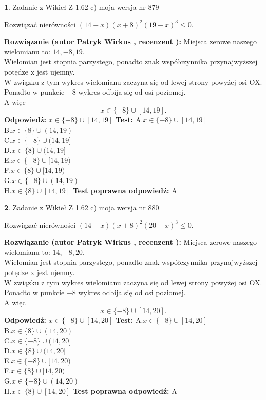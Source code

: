 \documentclass[12pt, a4paper]{article}
\theoremstyle{definition} %
\newtheorem{zad}{}
\newcommand{\zadStart}[1]{\begin{zad}#1\newline}
\newcommand{\zadStop}{\end{zad}}
\newcommand{\rozwStart}[2]{\noindent \textbf{Rozwiązanie (autor #1 , recenzent #2): }\newline}
\newcommand{\rozwStop}{\newline}
\newcommand{\odpStart}{\noindent \textbf{Odpowiedź:}\newline}
\newcommand{\odpStop}{\newline}
\newcommand{\testStart}{\noindent \textbf{Test:}\newline}
\newcommand{\testStop}{\newline}
\newcommand{\kluczStart}{\noindent \textbf{Test poprawna odpowiedź:}\newline}
\newcommand{\kluczStop}{\newline}
\begin{document}
\zadStart{Zadanie z Wikieł Z 1.62 c) moja wersja nr 879}

Rozwiązać nierówności $(14-x)(x+8)^{2}(19-x)^{3}\le0$.
\zadStop
\rozwStart{Patryk Wirkus}{}
Miejsca zerowe naszego wielomianu to: $14, -8, 19$.\\
Wielomian jest stopnia parzystego, ponadto znak współczynnika przy\linebreak najwyższej potędze x jest ujemny.\\ W związku z tym wykres wielomianu zaczyna się od lewej strony powyżej osi OX.\\
Ponadto w punkcie $-8$ wykres odbija się od osi poziomej.\\
A więc $$x \in \{-8\} \cup [14,19].$$
\rozwStop
\odpStart
$x \in \{-8\} \cup [14,19]$
\odpStop
\testStart
A.$x \in \{-8\} \cup [14,19]$\\
B.$x \in \{8\} \cup (14,19)$\\
C.$x \in \{-8\} \cup (14,19]$\\
D.$x \in \{8\} \cup (14,19]$\\
E.$x \in \{-8\} \cup [14,19)$\\
F.$x \in \{8\} \cup [14,19)$\\
G.$x \in \{-8\} \cup (14,19)$\\
H.$x \in \{8\} \cup [14,19]$
\testStop
\kluczStart
A
\kluczStop



\zadStart{Zadanie z Wikieł Z 1.62 c) moja wersja nr 880}

Rozwiązać nierówności $(14-x)(x+8)^{2}(20-x)^{3}\le0$.
\zadStop
\rozwStart{Patryk Wirkus}{}
Miejsca zerowe naszego wielomianu to: $14, -8, 20$.\\
Wielomian jest stopnia parzystego, ponadto znak współczynnika przy\linebreak najwyższej potędze x jest ujemny.\\ W związku z tym wykres wielomianu zaczyna się od lewej strony powyżej osi OX.\\
Ponadto w punkcie $-8$ wykres odbija się od osi poziomej.\\
A więc $$x \in \{-8\} \cup [14,20].$$
\rozwStop
\odpStart
$x \in \{-8\} \cup [14,20]$
\odpStop
\testStart
A.$x \in \{-8\} \cup [14,20]$\\
B.$x \in \{8\} \cup (14,20)$\\
C.$x \in \{-8\} \cup (14,20]$\\
D.$x \in \{8\} \cup (14,20]$\\
E.$x \in \{-8\} \cup [14,20)$\\
F.$x \in \{8\} \cup [14,20)$\\
G.$x \in \{-8\} \cup (14,20)$\\
H.$x \in \{8\} \cup [14,20]$
\testStop
\kluczStart
A
\kluczStop
\end{document}
